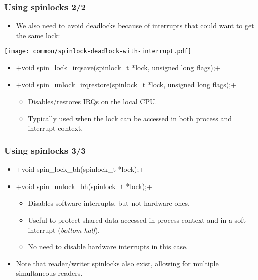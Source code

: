 \begin{frame}[fragile]
  \frametitle{Using spinlocks 2/2}
  \begin{itemize}
  \item We also need to avoid deadlocks because of interrupts that could want
    to get the same lock:
  \end{itemize}
  \texttt{[image: common/spinlock-deadlock-with-interrupt.pdf]}
  \begin{itemize}
  \item {}+void spin_lock_irqsave(spinlock_t *lock, unsigned long flags);+
  \item {}+void spin_unlock_irqrestore(spinlock_t *lock, unsigned long flags);+
    \begin{itemize}
    \item Disables/restores IRQs on the local CPU.
    \item Typically used when the lock can be accessed in both process
      and interrupt context.
    \end{itemize}
  \end{itemize}
\end{frame}

\begin{frame}[fragile]
  \frametitle{Using spinlocks 3/3}
  \begin{itemize}
  \item {}+void spin_lock_bh(spinlock_t *lock);+
  \item {}+void spin_unlock_bh(spinlock_t *lock);+
    \begin{itemize}
    \item Disables software interrupts, but not hardware ones.
    \item Useful to protect shared data accessed in process context
      and in a soft interrupt (\emph{bottom half}).
    \item No need to disable hardware interrupts in this case.
    \end{itemize}
  \item Note that reader/writer spinlocks also exist, allowing
	for multiple simultaneous readers.
  \end{itemize}
\end{frame}

